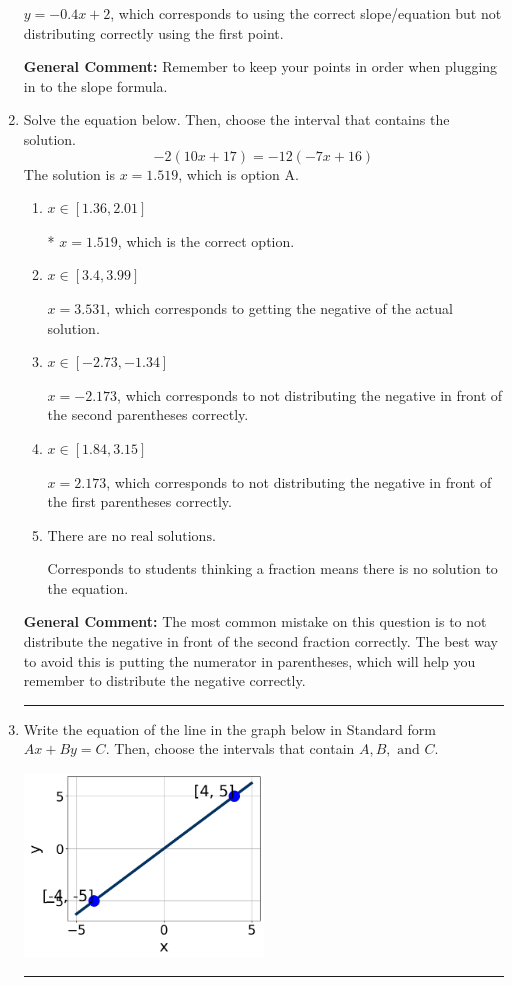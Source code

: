 \documentclass{extbook}[14pt]
\newcommand{\litem}[1]{\item #1

\rule{\textwidth}{0.4pt}}
\begin{document}
\begin{enumerate}
{\begin{enumerate}[label=\Alph*.]
 $y = -0.4x + 2$, which corresponds to using the correct slope/equation but not distributing correctly using the first point.
\end{enumerate}

\textbf{General Comment:} Remember to keep your points in order when plugging in to the slope formula.
}
\litem{
Solve the equation below. Then, choose the interval that contains the solution.
\[ -2(10x + 17) = -12(-7x + 16) \]The solution is \( x = 1.519 \), which is option A.\begin{enumerate}[label=\Alph*.]
\item \( x \in [1.36, 2.01] \)

* $x = 1.519$, which is the correct option.
\item \( x \in [3.4, 3.99] \)

$x = 3.531$, which corresponds to getting the negative of the actual solution.
\item \( x \in [-2.73, -1.34] \)

$x = -2.173$, which corresponds to not distributing the negative in front of the second parentheses correctly.
\item \( x \in [1.84, 3.15] \)

$x = 2.173$, which corresponds to not distributing the negative in front of the first parentheses correctly.
\item \( \text{There are no real solutions.} \)

Corresponds to students thinking a fraction means there is no solution to the equation.
\end{enumerate}

\textbf{General Comment:} The most common mistake on this question is to not distribute the negative in front of the second fraction correctly. The best way to avoid this is putting the numerator in parentheses, which will help you remember to distribute the negative correctly.
}
\litem{
Write the equation of the line in the graph below in Standard form $Ax+By=C$. Then, choose the intervals that contain $A, B, \text{ and } C$.

\begin{center}
    \includegraphics[width=0.5\textwidth]{../Figures/linearGraphToStandardC.png}
\end{center}


}
\end{enumerate}
\end{document}
